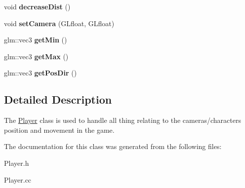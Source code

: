 \begin{DoxyCompactItemize}
\item 
void {\bfseries decrease\+Dist} ()\hypertarget{classPlayer_a065f67a45f999fb75ba4bd86ca0e0aa7}{}\label{classPlayer_a065f67a45f999fb75ba4bd86ca0e0aa7}

\item 
void {\bfseries set\+Camera} (G\+Lfloat, G\+Lfloat)\hypertarget{classPlayer_a41bae651f90eb67a84f801e89c6e6072}{}\label{classPlayer_a41bae651f90eb67a84f801e89c6e6072}

\item 
glm\+::vec3 {\bfseries get\+Min} ()\hypertarget{classPlayer_aed6199ac6d37ec3795750b4058a7230b}{}\label{classPlayer_aed6199ac6d37ec3795750b4058a7230b}

\item 
glm\+::vec3 {\bfseries get\+Max} ()\hypertarget{classPlayer_ae3e6a1b495d4c086a3ea7e2f10421971}{}\label{classPlayer_ae3e6a1b495d4c086a3ea7e2f10421971}

\item 
glm\+::vec3 {\bfseries get\+Pos\+Dir} ()\hypertarget{classPlayer_aa5f709f75639a8be00a8b235629e57fe}{}\label{classPlayer_aa5f709f75639a8be00a8b235629e57fe}

\end{DoxyCompactItemize}


\subsection{Detailed Description}
The \hyperlink{classPlayer}{Player} class is used to handle all thing relating to the cameras/characters position and movement in the game. 

The documentation for this class was generated from the following files\+:\begin{DoxyCompactItemize}
\item 
Player.\+h\item 
Player.\+cc\end{DoxyCompactItemize}
